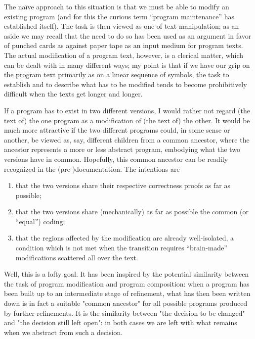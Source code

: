The naïve approach to this situation is that we must be able to modify an existing program (and for this the curious term ``program maintenance'' has established itself). The task is then viewed as one of text manipulation; as an aside we may recall that the need to do so has been used as an argument in favor of punched cards as against paper tape as an input medium for program texts. The actual modification of a program text, however, is a clerical matter, which can be dealt with in many different ways; my point is that if we have our grip on the program text  primarily as on a linear sequence of symbols, the task to establish and to describe what has to be modified tends to become prohibitively difficult when the texts get longer and longer.

If a program has to exist in two different versions, I would rather not regard (the text of) the one program as a modification of (the text of) the other. It would be much more attractive if the two different programs could, in some sense or another, be viewed as, say, different children from a common ancestor, where the ancestor represents a more or less abstract program, embodying what the two versions have in common. Hopefully, this common ancestor can be readily recognized in the (pre-)documentation. The intentions are

\begin{enumerate}[label=(\arabic*)]
	\item that the two versions share their respective correctness proofs as far as possible;

	\item that the two versions share (mechanically) as far as possible the common (or ``equal'') coding;

	\item that the regions affected by the modification are already well-isolated, a condition which is not met when the transition requires ``brain-made'' modifications scattered all over the text.
\end{enumerate}

Well, this is a lofty goal. It has been inspired by the potential similarity between the task of program modification and program composition: when a program has been built up to an intermediate stage of refinement, what has then been written down is in fact a suitable "common ancestor" for all possible programs produced by further refinements. It is the similarity between "the decision to be changed" and "the decision still left open": in both cases we are left with what remains when we abstract from such a decision.

